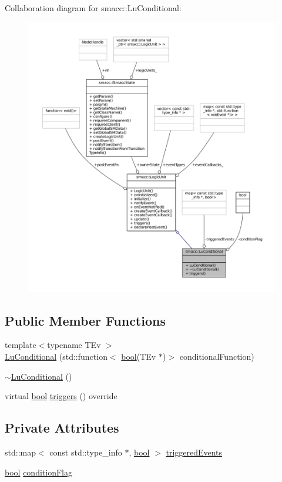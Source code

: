 Collaboration diagram for smacc\+:\+:Lu\+Conditional\+:
\nopagebreak
\begin{figure}[H]
\begin{center}
\leavevmode
\includegraphics[width=350pt]{classsmacc_1_1LuConditional__coll__graph}
\end{center}
\end{figure}
\subsection*{Public Member Functions}
\begin{DoxyCompactItemize}
\item 
{\footnotesize template$<$typename T\+Ev $>$ }\\\hyperlink{classsmacc_1_1LuConditional_a0667a61296163c249ea203dd95c71448}{Lu\+Conditional} (std\+::function$<$ \hyperlink{classbool}{bool}(T\+Ev $\ast$)$>$ conditional\+Function)
\item 
\hyperlink{classsmacc_1_1LuConditional_addfe549d9f8511075ef6e6c73aa93562}{$\sim$\+Lu\+Conditional} ()
\item 
virtual \hyperlink{classbool}{bool} \hyperlink{classsmacc_1_1LuConditional_ab7e894c1d6a0bf0c96d9c2ea0a08fed7}{triggers} () override
\end{DoxyCompactItemize}
\subsection*{Private Attributes}
\begin{DoxyCompactItemize}
\item 
std\+::map$<$ const std\+::type\+\_\+info $\ast$, \hyperlink{classbool}{bool} $>$ \hyperlink{classsmacc_1_1LuConditional_a0bc63c3144980b6ae65c91a6722ec87e}{triggered\+Events}
\item 
\hyperlink{classbool}{bool} \hyperlink{classsmacc_1_1LuConditional_aa4ba603a8ae5544b298ec6254c103b56}{condition\+Flag}
\end{DoxyCompactItemize}
